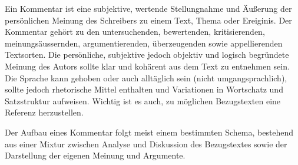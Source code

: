 



\thispagestyle{plain}



Ein Kommentar ist eine subjektive, wertende Stellungnahme und \"{A}u\ss{}erung der pers\"{o}nlichen Meinung des Schreibers zu einem Text, Thema oder Ereiginis. Der Kommentar geh\"{o}rt zu den untersuchenden, bewertenden, kritisierenden, meinungs\"{a}ussernden, argumentierenden, \"{u}berzeugenden sowie appellierenden Textsorten. Die pers\"{o}nliche, subjektive jedoch objektiv und logisch begr\"{u}ndete Meinung des Autors sollte klar und koh\"{a}rent aus dem Text zu entnehmen sein. Die Sprache kann gehoben oder auch allt\"{a}glich sein (nicht umgangsprachlich), sollte jedoch rhetorische Mittel enthalten und Variationen in Wortschatz und Satzstruktur aufweisen. Wichtig ist es auch, zu m\"{o}glichen Bezugstexten eine Referenz herzustellen.


Der Aufbau eines Kommentar folgt meist einem bestimmten Schema, bestehend aus einer Mixtur zwischen Analyse und Diskussion des Bezugstextes sowie der Darstellung der eigenen Meinung und Argumente.

